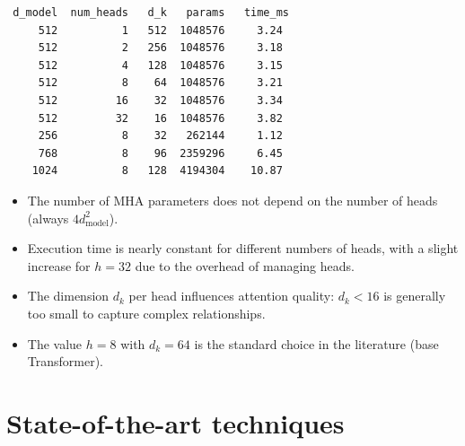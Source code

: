 \begin{codeoutput}
\begin{verbatim}
 d_model  num_heads   d_k   params   time_ms
     512          1   512  1048576     3.24
     512          2   256  1048576     3.18
     512          4   128  1048576     3.15
     512          8    64  1048576     3.21
     512         16    32  1048576     3.34
     512         32    16  1048576     3.82
     256          8    32   262144     1.12
     768          8    96  2359296     6.45
    1024          8   128  4194304    10.87
\end{verbatim}
\end{codeoutput}

\begin{remark}[Observations]
\begin{itemize}
  \item The number of MHA parameters does not depend on the number of heads
    (always $4 d_{\text{model}}^2$).
  \item Execution time is nearly constant for different numbers of heads,
    with a slight increase for $h = 32$ due to the overhead of managing heads.
  \item The dimension $d_k$ per head influences attention quality: $d_k < 16$
    is generally too small to capture complex relationships.
  \item The value $h = 8$ with $d_k = 64$ is the standard choice in the
    literature (base Transformer).
\end{itemize}
\end{remark}

\section{State-of-the-art techniques}
\label{sec:attention-sota}

